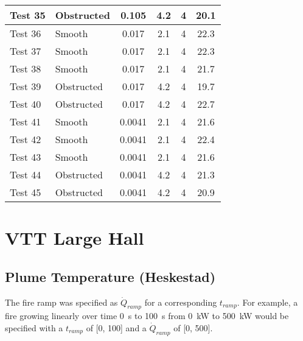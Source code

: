 \begin{table}[!h]
\begin{center}
\begin {tabular}{|l|l|c|c|c|c|}
Test 35    &  Obstructed    &  0.105            &  4.2        &  4             &  20.1              \\ \hline
Test 36    &  Smooth        &  0.017            &  2.1        &  4             &  22.3              \\ \hline
Test 37    &  Smooth        &  0.017            &  2.1        &  4             &  22.3              \\ \hline
Test 38    &  Smooth        &  0.017            &  2.1        &  4             &  21.7              \\ \hline
Test 39    &  Obstructed    &  0.017            &  4.2        &  4             &  19.7              \\ \hline
Test 40    &  Obstructed    &  0.017            &  4.2        &  4             &  22.7              \\ \hline
Test 41    &  Smooth        &  0.0041           &  2.1        &  4             &  21.6              \\ \hline
Test 42    &  Smooth        &  0.0041           &  2.1        &  4             &  22.4              \\ \hline
Test 43    &  Smooth        &  0.0041           &  2.1        &  4             &  21.6              \\ \hline
Test 44    &  Obstructed    &  0.0041           &  4.2        &  4             &  21.3              \\ \hline
Test 45    &  Obstructed    &  0.0041           &  4.2        &  4             &  20.9              \\ \hline
\end{tabular}
\end{center}
\end{table}


\clearpage


\section{VTT Large Hall}

\subsection*{Plume Temperature (Heskestad)}

The fire ramp was specified as $\dot Q_{ramp}$ for a corresponding $t_{ramp}$.
For example, a fire growing linearly over time 0~s to 100~s from 0~kW to 500~kW
would be specified with a $t_{ramp}$ of [0, 100] and a $\dot Q_{ramp}$ of [0, 500].

